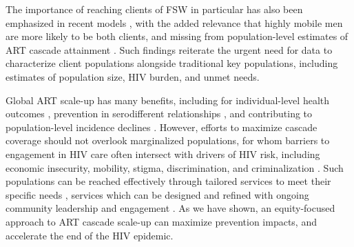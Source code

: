 The importance of reaching clients of FSW in particular
has also been emphasized in recent models \cite{Stone2021,Silhol2024},
with the added relevance that highly mobile men are more likely to be both clients,
and missing from population-level estimates of ART cascade attainment
\cite{Akullian2017,Camlin2019}.
Such findings reiterate the urgent need for data to characterize
client populations alongside traditional key populations,
including estimates of population size, HIV burden, and unmet needs.
\par
Global ART scale-up has many benefits, including for
individual-level health outcomes \cite{Gabillard2013,Lundgren2015init},
prevention in serodifferent relationships \cite{Cohen2016},
and contributing to population-level incidence declines \cite{Havlir2020}.
However, efforts to maximize cascade coverage should not overlook marginalized populations,
for whom barriers to engagement in HIV care often intersect with drivers of HIV risk,
including economic insecurity, mobility, stigma, discrimination, and criminalization
\cite{Wanyenze2016,Schwartz2017,Schmidt-Sane2022,Camlin2019,Baral2019}.
Such populations can be reached effectively through
tailored services to meet their specific needs \cite{Ehrenkranz2019},
services which can be designed and refined with ongoing community leadership and engagement
\cite{Chikwari2018,Mlambo2019,Comins2022}.
As we have shown, an equity-focused approach to ART cascade scale-up
can maximize prevention impacts, and accelerate the end of the HIV epidemic.
\par
